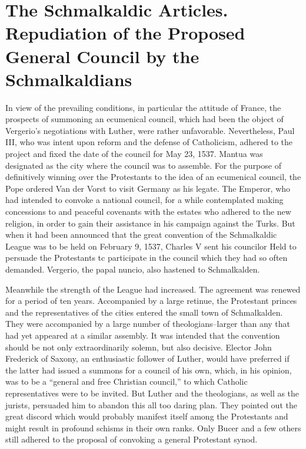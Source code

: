 \section{The Schmalkaldic Articles. Repudiation of the Proposed General Council by the Schmalkaldians}

In view of the prevailing conditions, in particular the attitude of
France, the prospects of summoning an ecumenical council, which
had been the object of Vergerio’s negotiations with Luther, were
rather unfavorable. Nevertheless, Paul III, who was intent upon reform
and the defense of Catholicism, adhered to the project and
fixed the date of the council for May 23, 1537. Mantua was designated
as the city where the council was to assemble. For the purpose
of definitively winning over the Protestants to the idea of an ecumenical
council, the Pope ordered Van der Vorst to visit Germany
as his legate. The Emperor, who had intended to convoke a national
council, for a while contemplated making concessions to and peaceful
covenants with the estates who adhered to the new religion, in order
to gain their assistance in his campaign against the Turks. But when
it had been announced that the great convention of the Schmalkaldic
League was to be held on February 9, 1537, Charles V sent his councilor
Held to persuade the Protestants tc participate in the council
which they had so often demanded. Vergerio, the papal nuncio, also
hastened to Schmalkalden.

Meanwhile the strength of the League had increased. The agreement
was renewed for a period of ten years. Accompanied by a large retinue,
the Protestant princes and the representatives of the cities entered the
small town of Schmalkalden. They were accompanied by a
large number of theologians--larger than any that had yet appeared
at a similar assembly. It was intended that the convention should be
not only extraordinarily solemn, but also decisive. Elector John Frederick
of Saxony, an enthusiastic follower of Luther, would have preferred if
the latter had issued a summons for a council of his own,
which, in his opinion, was to be a “general and free Christian council,”
to which Catholic representatives were to be invited. But Luther
and the theologians, as well as the jurists, persuaded him to abandon
this all too daring plan. They pointed out the great discord which
would probably manifest itself among the Protestants and might result
in profound schisms in their own ranks. Only Bucer and a few
others still adhered to the proposal of convoking a general Protestant
synod.

